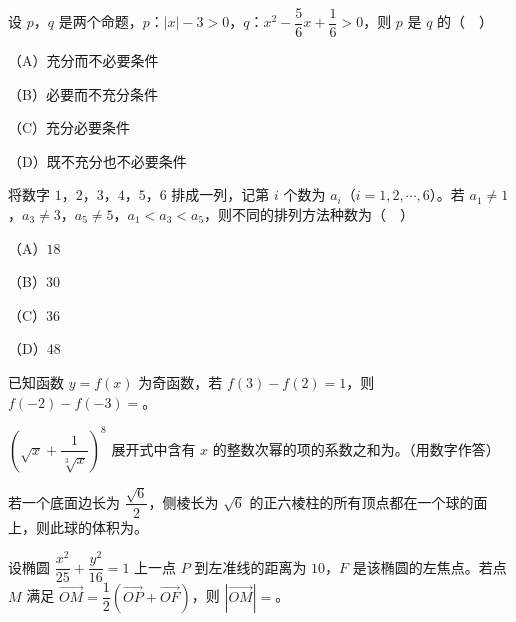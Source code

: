 \begin{question}
设 $p$，$q$ 是两个命题，$p$：$|x|-3>0$，$q$：$x^2-\dfrac56x+\dfrac16>0$，则 $p$ 是 $q$ 的（　）

（A）充分而不必要条件

（B）必要而不充分条件

（C）充分必要条件

（D）既不充分也不必要条件

\end{question}
\begin{question}
将数字 $1$，$2$，$3$，$4$，$5$，$6$ 排成一列，记第 $i$ 个数为 $a_i$（$i=1,2,\cdots,6$）。若 $a_1\neq1$，$a_3\neq3$，$a_5\neq5$，$a_1<a_3<a_5$，则不同的排列方法种数为（　）

（A）$18$

（B）$30$

（C）$36$

（D）$48$

\end{question}

\begin{question}
已知函数 $y=f(x)$ 为奇函数，若 $f(3)-f(2)=1$，则 $f(-2)-f(-3)=$\gkblank{}。

\end{question}
\begin{question}
$\left(\sqrt x+\dfrac1{\sqrt[3]x}\right)^8$ 展开式中含有 $x$ 的整数次幂的项的系数之和为\gkblank{}。（用数字作答）

\end{question}
\begin{question}
若一个底面边长为 $\dfrac{\sqrt6}{2}$，侧棱长为 $\sqrt6$ 的正六棱柱的所有顶点都在一个球的面上，则此球的体积为\gkblank{}。

\end{question}
\begin{question}
设椭圆 $\dfrac{x^2}{25}+\dfrac{y^2}{16}=1$ 上一点 $P$ 到左准线的距离为 $10$，$F$ 是该椭圆的左焦点。若点 $M$ 满足 $\overrightarrow{OM}=\dfrac12\left(\overrightarrow{OP}+\overrightarrow{OF}\right)$，则 $|\overrightarrow{OM}|=$\gkblank{}。

\end{question}

